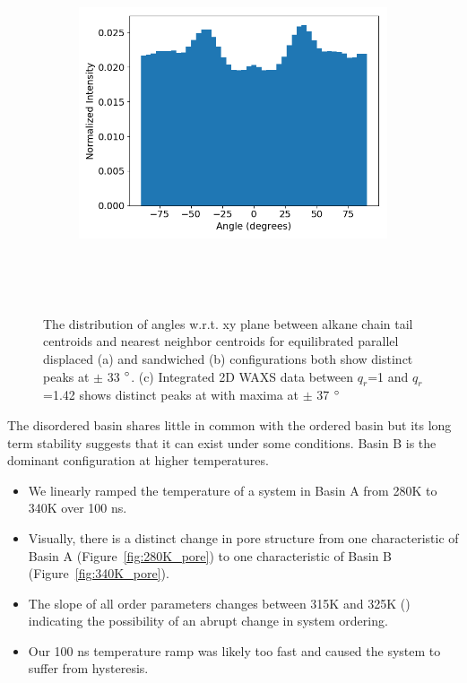 \documentclass{article}
\begin{document}
\begin{figure}[ht]
\begin{subfigure}{0.3\linewidth}
        \includegraphics[width=\linewidth]{integrated_WAXS_ring.png}
        \caption{}~\label{fig:rz_layered}
  \end{subfigure}
  \caption{The distribution of angles w.r.t. xy plane between alkane chain tail centroids and nearest
  neighbor centroids for equilibrated parallel displaced (a) and sandwiched (b) configurations both show
  distinct peaks at $\pm$ 33 $\degree$. (c) Integrated 2D WAXS data between $q_r$=1 and $q_r$=1.42 shows
  distinct peaks at with maxima at $\pm$ 37 $\degree$}~\label{fig:tail_packing}
  \end{figure}
 
  The disordered basin shares little in common with the ordered basin but 
  its long term stability suggests that it can exist under some conditions.  
  Basin B is the dominant configuration at higher temperatures.
  \begin{itemize}
        \item We linearly ramped the temperature of a system in Basin A
        from 280K to 340K over 100 ns.
        \item Visually, there is a distinct change in pore structure from one
        characteristic of Basin A (Figure~\ref{fig:280K_pore}) to one characteristic of
        Basin B (Figure~\ref{fig:340K_pore}).
        \item The slope of all order parameters changes between 315K and 325K
        () indicating the
        possibility of an abrupt change in system ordering.
        \item Our 100 ns temperature ramp was likely too fast and caused the system
        to suffer from hysteresis.
  \end{itemize}
\end{document}
